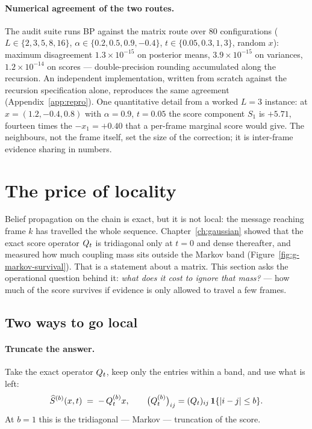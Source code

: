 \paragraph{Numerical agreement of the two routes.} The audit suite runs BP
against the matrix route over $80$ configurations
($L \in \{2,3,5,8,16\}$, $\alpha \in \{0.2, 0.5, 0.9, -0.4\}$,
$t \in \{0.05, 0.3, 1, 3\}$, random $x$): maximum disagreement
$1.3 \times 10^{-15}$ on posterior means, $3.9 \times 10^{-15}$ on variances,
$1.2 \times 10^{-14}$ on scores --- double-precision rounding accumulated along
the recursion. An independent implementation, written from scratch against the
recursion specification alone, reproduces the same agreement
(Appendix~\ref{app:repro}). One quantitative detail from a worked $L = 3$
instance: at $x = (1.2, -0.4, 0.8)$ with $\alpha = 0.9$, $t = 0.05$ the
score component $S_1$ is $+5.71$, fourteen times the $-x_1 = +0.40$ that a
per-frame marginal score would give. The neighbours, not the frame itself,
set the size of the correction; it is inter-frame evidence sharing in
numbers.

\section{The price of locality}
\label{sec:bp-locality}\label{sec:g-bulk}\label{sec:g-locality}\label{sec:bp-truncation}

Belief propagation on the chain is exact, but it is not local: the message
reaching frame $k$ has travelled the whole sequence. Chapter~\ref{ch:gaussian}
showed that the exact score operator $Q_t$ is tridiagonal only at $t = 0$ and
dense thereafter, and measured how much coupling mass sits outside the Markov
band (Figure~\ref{fig:g-markov-survival}). That is a statement about a matrix.
This section asks the operational question behind it: \emph{what does it cost
to ignore that mass?} --- how much of the score survives if evidence is only
allowed to travel a few frames.

\subsection{Two ways to go local}

\paragraph{Truncate the answer.} Take the exact operator $Q_t$, keep only the
entries within a band, and use what is left:
\begin{equation}
  \widehat S^{(b)}(x,t) \;=\; -\,Q_t^{(b)} x,
  \qquad
  \big(Q_t^{(b)}\big)_{ij} = (Q_t)_{ij}\,\mathbf{1}\{|i-j| \le b\}.
  \label{eq:bp-banded}
\end{equation}
At $b = 1$ this is the tridiagonal --- Markov --- truncation of the score.

